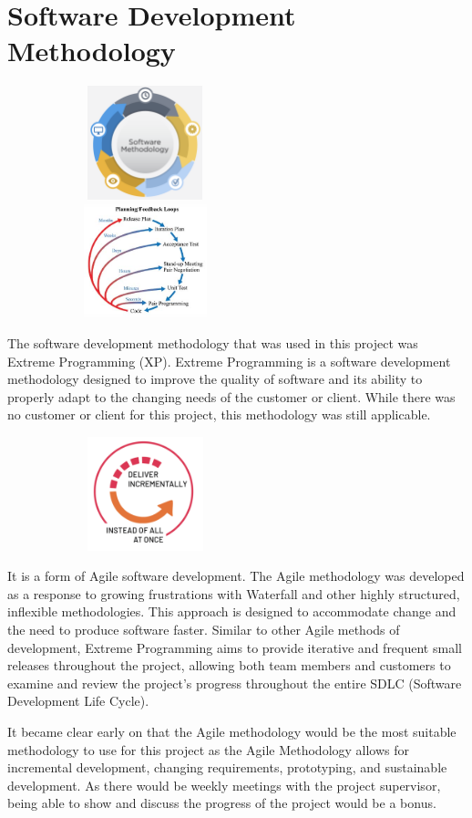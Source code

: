 \section{Software Development Methodology}
\begin{center}
    \includegraphics[width=8cm,height=3.3cm,keepaspectratio]{images/software_methodology}
    \includegraphics[width=8cm,height=3.3cm,keepaspectratio]{images/xp}
\end{center}
\par
The software development methodology that was used in this project was Extreme Programming (XP). Extreme Programming is a software development methodology designed to improve the quality of software and its ability to properly adapt to the changing needs of the customer or client. While there was no customer or client for this project, this methodology was still applicable. 
\par
\medskip
\begin{center}
    \includegraphics[width=8cm,height=3.3cm,keepaspectratio]{images/agile}
\end{center}
It is a form of Agile software development. The Agile methodology was developed as a response to growing frustrations with Waterfall and other highly structured, inflexible methodologies. This approach is designed to accommodate change and the need to produce software faster. Similar to other Agile methods of development, Extreme Programming aims to provide iterative and frequent small releases throughout the project, allowing both team members and customers to examine and review the project’s progress throughout the entire SDLC (Software Development Life Cycle). 
\par
\medskip
It became clear early on that the Agile methodology would be the most suitable methodology to use for this project as the Agile Methodology allows for incremental development, changing requirements, prototyping, and sustainable development. As there would be weekly meetings with the project supervisor, being able to show and discuss the progress of the project would be a bonus. 

